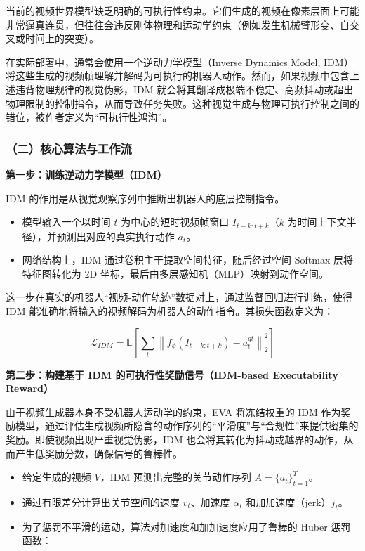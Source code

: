 当前的视频世界模型缺乏明确的可执行性约束。它们生成的视频在像素层面上可能非常逼真连贯，但往往会违反刚体物理和运动学约束（例如发生机械臂形变、自交叉或时间上的突变）。

在实际部署中，通常会使用一个逆动力学模型（Inverse Dynamics Model, IDM）将这些生成的视频帧理解并解码为可执行的机器人动作。然而，如果视频中包含上述违背物理规律的视觉伪影，IDM 就会将其翻译成极端不稳定、高频抖动或超出物理限制的控制指令，从而导致任务失败。这种视觉生成与物理可执行控制之间的错位，被作者定义为``可执行性鸿沟''。

\hypertarget{ux4e8cux6838ux5fc3ux7b97ux6cd5ux4e0eux5de5ux4f5cux6d41-2}{%
\subsubsection{（二）核心算法与工作流}\label{ux4e8cux6838ux5fc3ux7b97ux6cd5ux4e0eux5de5ux4f5cux6d41-2}}

\textbf{第一步：训练逆动力学模型（IDM）}

IDM 的作用是从视觉观察序列中推断出机器人的底层控制指令。

\begin{itemize}
\tightlist
\item
  模型输入一个以时间 \(t\) 为中心的短时视频帧窗口 \(I_{t-k:t+k}\)（\(k\) 为时间上下文半径），并预测出对应的真实执行动作 \(a_t\)。
\item
  网络结构上，IDM 通过卷积主干提取空间特征，随后经过空间 Softmax 层将特征图转化为 2D 坐标，最后由多层感知机（MLP）映射到动作空间。
\end{itemize}

这一步在真实的机器人``视频-动作轨迹''数据对上，通过监督回归进行训练，使得 IDM 能准确地将输入的视频解码为机器人的动作指令。其损失函数定义为：

\[
\mathcal{L}_{IDM} = \mathbb{E}\left[\sum_t \left\| f_{\phi}(I_{t-k:t+k}) - a_t^{gt} \right\|_2^2\right]
\]

\textbf{第二步：构建基于 IDM 的可执行性奖励信号（IDM-based Executability Reward）}

由于视频生成器本身不受机器人运动学的约束，EVA 将冻结权重的 IDM 作为奖励模型，通过评估生成视频所隐含的动作序列的``平滑度''与``合规性''来提供密集的奖励。即使视频出现严重视觉伪影，IDM 也会将其转化为抖动或越界的动作，从而产生低奖励分数，确保信号的鲁棒性。

\begin{itemize}
\tightlist
\item
  给定生成的视频 \(V\)，IDM 预测出完整的关节动作序列 \(A = \{a_t\}_{t=1}^{T}\)。
\item
  通过有限差分计算出关节空间的速度 \(v_t\)、加速度 \(\alpha_t\) 和加加速度（jerk）\(j_t\)。
\item
  为了惩罚不平滑的运动，算法对加速度和加加速度应用了鲁棒的 Huber 惩罚函数：
\end{itemize}

